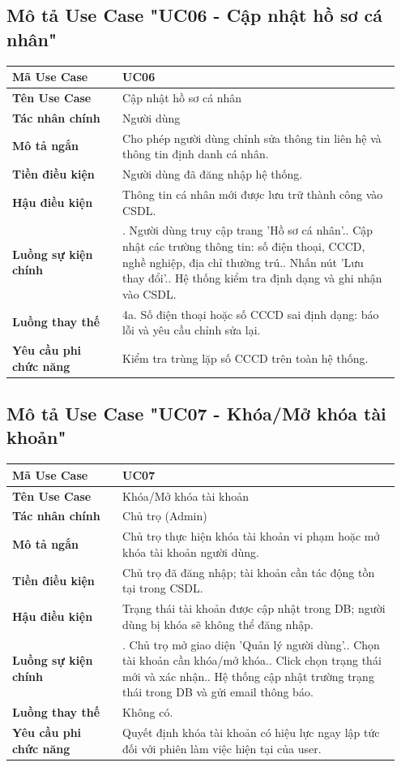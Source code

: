 \subsection{Mô tả Use Case "UC06 - Cập nhật hồ sơ cá nhân"}

\begin{longtable}[]{@{}>{\RaggedRight\arraybackslash}p{0.27\linewidth}>{\RaggedRight\arraybackslash}p{0.68\linewidth}@{}}
\toprule
\textbf{Mã Use Case} & UC06\tabularnewline
\midrule
\endhead
\textbf{Tên Use Case} & Cập nhật hồ sơ cá nhân\tabularnewline
\textbf{Tác nhân chính} & Người dùng\tabularnewline
\textbf{Mô tả ngắn} & Cho phép người dùng chỉnh sửa thông tin liên hệ và
thông tin định danh cá nhân.\tabularnewline
\textbf{Tiền điều kiện} & Người dùng đã đăng nhập hệ
thống.\tabularnewline
\textbf{Hậu điều kiện} & Thông tin cá nhân mới được lưu trữ thành công
vào CSDL.\tabularnewline
\textbf{Luồng sự kiện chính} & 1. Người dùng truy cập
trang 'Hồ sơ cá nhân'.\newline 2. Cập nhật các trường thông tin: số
điện thoại, CCCD, nghề nghiệp, địa chỉ thường trú.\newline 3. Nhấn
nút 'Lưu thay đổi'.\newline 4. Hệ thống kiểm tra định dạng và ghi
nhận vào CSDL.\tabularnewline
\textbf{Luồng thay thế} & 4a. Số điện thoại hoặc số CCCD sai định dạng:
báo lỗi và yêu cầu chỉnh sửa lại.\tabularnewline
\textbf{Yêu cầu phi chức năng} & Kiểm tra trùng lặp số CCCD trên toàn hệ
thống.\tabularnewline
\bottomrule
\end{longtable}

\subsection{Mô tả Use Case "UC07 - Khóa/Mở khóa tài khoản"}

\begin{longtable}[]{@{}>{\RaggedRight\arraybackslash}p{0.27\linewidth}>{\RaggedRight\arraybackslash}p{0.68\linewidth}@{}}
\toprule
\textbf{Mã Use Case} & UC07\tabularnewline
\midrule
\endhead
\textbf{Tên Use Case} & Khóa/Mở khóa tài khoản\tabularnewline
\textbf{Tác nhân chính} & Chủ trọ (Admin)\tabularnewline
\textbf{Mô tả ngắn} & Chủ trọ thực hiện khóa tài khoản vi phạm hoặc mở
khóa tài khoản người dùng.\tabularnewline
\textbf{Tiền điều kiện} & Chủ trọ đã đăng nhập; tài khoản cần tác động
tồn tại trong CSDL.\tabularnewline
\textbf{Hậu điều kiện} & Trạng thái tài khoản được cập nhật trong DB;
người dùng bị khóa sẽ không thể đăng nhập.\tabularnewline
\textbf{Luồng sự kiện chính} & 1. Chủ trọ mở giao
diện 'Quản lý người dùng'.\newline 2. Chọn tài khoản cần khóa/mở
khóa.\newline 3. Click chọn trạng thái mới và xác
nhận.\newline 4. Hệ thống cập nhật trường trạng thái trong DB và
gửi email thông báo.\tabularnewline
\textbf{Luồng thay thế} & Không có.\tabularnewline
\textbf{Yêu cầu phi chức năng} & Quyết định khóa tài khoản có hiệu lực
ngay lập tức đối với phiên làm việc hiện tại của user.\tabularnewline
\bottomrule
\end{longtable}


